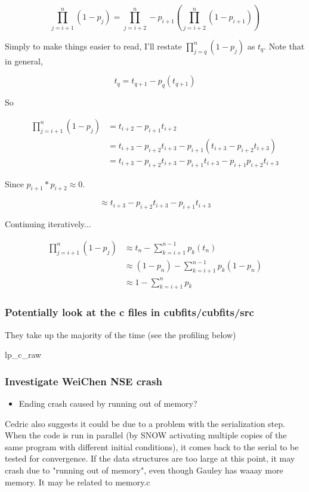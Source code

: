 $$\prod_{j=i+1}^{n} (1-p_j)= \prod_{j=i+2}^{n} - p_{i+1}\left(\prod_{j=i+2}^{n}(1-p_{i+1})\right)$$

Simply to make things easier to read, I'll restate $\prod_{j=q}^{n} (1-p_j)$ as $t_q$. Note that in general,

$$t_q = t_{q+1} - p_q(t_{q+1})$$

So 

\begin{align*}
	\prod_{j=i+1}^{n} (1-p_j) &= t_{i+2} - p_{i+1}t_{i+2} \\
	&= t_{i+3} - p_{i+2}t_{i+3} - p_{i+1}\left(t_{i+3} - p_{i+2}t_{i+3}\right) \\
	&= t_{i+3} - p_{i+2}t_{i+3} - p_{i+1}t_{i+3} - p_{i+1}p_{i+2}t_{i+3}
\end{align*}

Since $p_{i+1} * p_{i+2} \approx 0$.

$$\approx t_{i+3} - p_{i+2}t_{i+3} - p_{i+1}t_{i+3}$$

Continuing iteratively...

\begin{align*}
	\prod_{j=i+1}^{n} (1-p_j) &\approx
	t_n - \sum_{k=i+1}^{n-1}p_k(t_n) \\
	&\approx (1-p_n) - \sum_{k=i+1}^{n-1}p_k(1 - p_n)\\
 	&\approx 1 -  \sum_{k=i+1}^{n}p_k
\end{align*}

\subsubsection{Potentially look at the c files in cubfits/cubfits/src}
They take up the majority of the time (see the profiling below)

lp\_c\_raw


\subsubsection{Investigate WeiChen NSE crash}
\begin{itemize}
\item Ending crash caused by running out of memory?
\end{itemize}

Cedric also suggests it could be due to a problem with the serialization step. When the code is run in parallel (by SNOW activating multiple copies of the same program with different initial conditions), it comes back to the serial to be tested for convergence. If the data structures are too large at this point, it may crash due to "running out of memory", even though Gauley has waaay more memory. It may be related to memory.c

